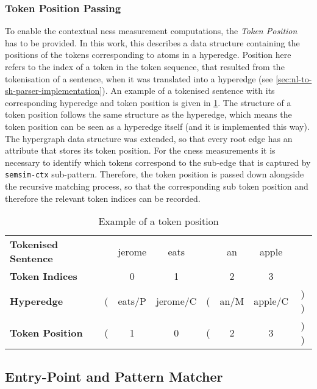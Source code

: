 \documentclass[11pt]{scrreprt}
\begin{document}
\subsubsection{Token Position Passing}
To enable the contextual \gls{ness} measurement computations, the \textit{Token Position} has to be provided. In this work, this describes a data structure containing the positions of the tokens corresponding to atoms in a hyperedge. Position here refers to the index of a token in the token sequence, that resulted from the tokenisation of a sentence, when it was translated into a hyperedge (see \cref{sec:nl-to-sh-parser-implementation}). An example of a tokenised sentence with its corresponding hyperedge and token position is given in \cref{tab:example-token-position}. 
The structure of a token position follows the same structure as the hyperedge, which means the token position can be seen as a hyperedge itself (and it is implemented this way). The hypergraph data structure was extended, so that every root edge has an attribute that stores its token position. For the \gls{cness} measurements it is necessary to identify which tokens correspond to the sub-edge that is captured by \texttt{semsim-ctx} sub-pattern. Therefore, the token position is passed down alongside the recursive matching process, so that the corresponding sub token position and therefore the relevant token indices can be recorded. 


\begin{table}
\centering
\begin{tabular}{lccccccc}

\textbf{Tokenised Sentence} &	  & jerome & eats &  & an & apple & \\
\textbf{Token Indices} &	  & 0	& 1 & & 2 & 3 & \\

	  \midrule

\textbf{Hyperedge} &	  ( & \textsf{eats/P} & \textsf{jerome/C} & ( & \textsf{an/M}  & \textsf{apple/C} & ) ) \\
\textbf{Token Position} & 	  ( & 1 & 0 & ( & 2 & 3 & ) )
\end{tabular}	
\caption{Example of a token position}
\label{tab:example-token-position}
\end{table}

 
\subsection{Entry-Point and Pattern Matcher} 
 
\end{document}

